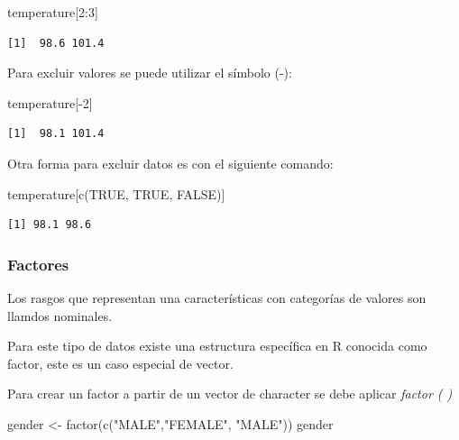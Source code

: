 \documentclass[
  letterpaper,
  DIV=11,
  numbers=noendperiod]{scrartcl}
\newenvironment{Shaded}{\begin{snugshade}}{\end{snugshade}}
\newcommand{\ConstantTok}[1]{\textcolor[rgb]{0.56,0.35,0.01}{#1}}
\newcommand{\DecValTok}[1]{\textcolor[rgb]{0.68,0.00,0.00}{#1}}
\newcommand{\FunctionTok}[1]{\textcolor[rgb]{0.28,0.35,0.67}{#1}}
\newcommand{\NormalTok}[1]{\textcolor[rgb]{0.00,0.23,0.31}{#1}}
\newcommand{\OtherTok}[1]{\textcolor[rgb]{0.00,0.23,0.31}{#1}}
\newcommand{\SpecialCharTok}[1]{\textcolor[rgb]{0.37,0.37,0.37}{#1}}
\newcommand{\StringTok}[1]{\textcolor[rgb]{0.13,0.47,0.30}{#1}}
\begin{document}
\begin{Shaded}
\begin{Highlighting}[]
\NormalTok{temperature[}\DecValTok{2}\SpecialCharTok{:}\DecValTok{3}\NormalTok{]}
\end{Highlighting}
\end{Shaded}

\begin{verbatim}
[1]  98.6 101.4
\end{verbatim}

Para excluir valores se puede utilizar el símbolo (-):

\begin{Shaded}
\begin{Highlighting}[]
\NormalTok{temperature[}\SpecialCharTok{{-}}\DecValTok{2}\NormalTok{]}
\end{Highlighting}
\end{Shaded}

\begin{verbatim}
[1]  98.1 101.4
\end{verbatim}

Otra forma para excluir datos es con el siguiente comando:

\begin{Shaded}
\begin{Highlighting}[]
\NormalTok{temperature[}\FunctionTok{c}\NormalTok{(}\ConstantTok{TRUE}\NormalTok{, }\ConstantTok{TRUE}\NormalTok{, }\ConstantTok{FALSE}\NormalTok{)]}
\end{Highlighting}
\end{Shaded}

\begin{verbatim}
[1] 98.1 98.6
\end{verbatim}

\hypertarget{factores}{%
\subsubsection{Factores}\label{factores}}

Los rasgos que representan una características con categorías de valores
son llamdos nominales.

Para este tipo de datos existe una estructura específica en R conocida
como factor, este es un caso especial de vector.

Para crear un factor a partir de un vector de character se debe aplicar
\emph{factor ( )}

\begin{Shaded}
\begin{Highlighting}[]
\NormalTok{gender }\OtherTok{\textless{}{-}} \FunctionTok{factor}\NormalTok{(}\FunctionTok{c}\NormalTok{(}\StringTok{"MALE"}\NormalTok{,}\StringTok{"FEMALE"}\NormalTok{, }\StringTok{"MALE"}\NormalTok{))}
\NormalTok{gender}
\end{Highlighting}
\end{Shaded}
\end{document}

